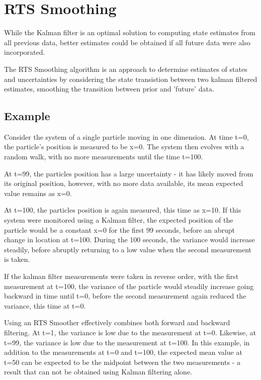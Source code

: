 \chapter{RTS Smoothing}

While the Kalman filter is an optimal solution to computing state estimates from all previous data, better estimates could be obtained if all future data were also incorporated.

The RTS Smoothing algorithm is an approach to determine estimates of states and uncertainties by considering the state transistion between two kalman filtered estimates, smoothing the transition between prior and 'future' data.

\section{Example} 

Consider the system of a single particle moving in one dimension. At time t=0, the particle's position is measured to be x=0. The system then evolves with a random walk, with no more measurements until the time t=100.

At t=99, the particles position has a large uncertainty - it has likely moved from its original position, however, with no more data available, its mean expected value remains as x=0.

At t=100, the particles position is again measured, this time as x=10. If this system were monitored using a Kalman filter, the expected position of the particle would be a constant x=0 for the first 99 seconds, before an abrupt change in location at t=100. During the 100 seconds, the variance would increase steadily, before abruptly returning to a low value when the second measurement is taken.

If the kalman filter measurements were taken in reverse order, with the first measurement at t=100, the variance of the particle would steadily increase going backward in time until t=0, before the second measurement again reduced the variance, this time at t=0.

Using an RTS Smoother effectively combines both forward and backward filtering. At t=1, the variance is low due to the measurement at t=0. Likewise, at t=99, the variance is low due to the measurement at t=100. In this example, in addition to the measurements at t=0 and t=100, the expected mean value at t=50 can be expected to be the midpoint between the two measurements - a result that can not be obtained using Kalman filtering alone.

